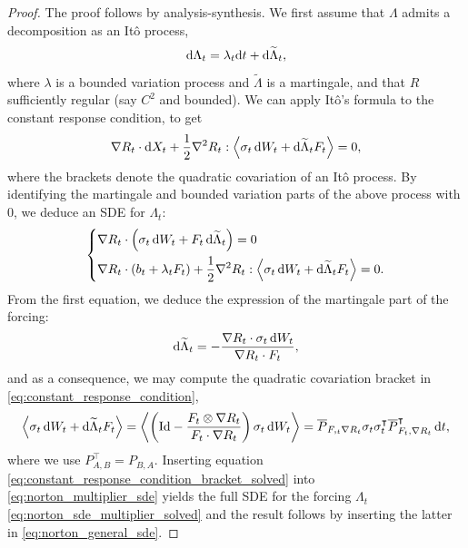 \begin{proof}
The proof follows by analysis-synthesis.
We first assume that $\Lambda$ admits a decomposition as an Itô process,
\begin{equation}
    \label{eq:norton_multiplier_decomposition}
    \mathrm{d} \Lambda_t = \lambda_t \mathrm{d} t + \mathrm{d} \widetilde{\Lambda}_t,
\end{equation}
where $\lambda$ is a bounded variation process and $\widetilde{\Lambda}$ is a martingale, and that $R$ sufficiently regular (say $C^2$ and bounded).
We can apply Itô's formula to the constant response condition, to get
\begin{equation}
    \label{eq:constant_response_condition}
     \nabla R_t \cdot \mathrm{d} X_t + \frac12\nabla^2 R_t:\left\langle\sigma_t\,\mathrm{d} W_t + \mathrm{d}\widetilde{\Lambda}_tF_t\right\rangle=0,
\end{equation}
where the brackets denote the quadratic covariation of an Itô process. By identifying the martingale and bounded variation parts of the above process with $0$, we deduce an SDE for $\Lambda_t$:
\begin{equation}
    \label{eq:norton_multiplier_sde}
    \left\{\begin{aligned}
        &\nabla R_t \cdot \left( \sigma_t\,\mathrm{d} W_t + F_t\,\mathrm{d} \widetilde{\Lambda}_t\right)=0\\
        &\nabla R_t \cdot \left( b_t + \lambda_t F_t\right)+\frac12\nabla^2 R_t: \left\langle\sigma_t\,\mathrm{d} W_t + \mathrm{d}\widetilde{\Lambda}_tF_t\right\rangle=0.
    \end{aligned}\right.
\end{equation}
From the first equation, we deduce the expression of the martingale part of the forcing:
\begin{equation}
    \label{eq:norton_multiplier_martingale}
    \mathrm{d} \widetilde{\Lambda}_t = - \frac{\nabla R_t\cdot \sigma_t\,\mathrm{d} W_t}{\nabla R_t\cdot F_t},
\end{equation}
and as a consequence, we may compute the quadratic covariation bracket in \eqref{eq:constant_response_condition},
\begin{equation}
    \label{eq:constant_response_condition_bracket_solved}
    \left\langle\sigma_t\,\mathrm{d} W_t + \mathrm{d}\widetilde{\Lambda}_tF_t\right\rangle=\left\langle\left(\mathrm{Id}-\frac{F_t\otimes \nabla R_t}{F_t\cdot \nabla R_t}\right)\sigma_t\,\mathrm{d} W_t\right\rangle = \overline{P}_{F,_t\nabla R_t}\sigma_t\sigma_t^\intercal\overline{P}^\intercal_{F_t,\nabla R_t}\,\mathrm{d} t,
\end{equation}
where we use $P^\intercal_{A,B}=P_{B,A}$. Inserting equation \eqref{eq:constant_response_condition_bracket_solved} into \eqref{eq:norton_multiplier_sde} yields the full SDE for the forcing $\Lambda_t$ \eqref{eq:norton_sde_multiplier_solved} and the result follows by inserting the latter in \eqref{eq:norton_general_sde}.
\end{proof}

